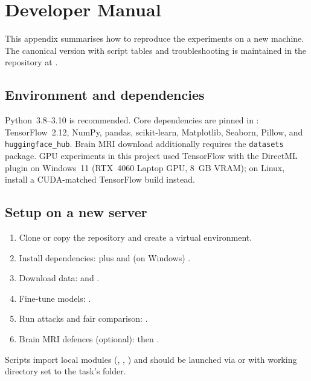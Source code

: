 \documentclass[12pt,a4paper,oneside]{report}
\begin{document}
\chapter{Developer Manual}
\label{app:dev-manual}

This appendix summarises how to reproduce the experiments on a new machine. The canonical version with script tables and troubleshooting is maintained in the repository at .

\section{Environment and dependencies}

Python~3.8--3.10 is recommended. Core dependencies are pinned in :
TensorFlow~2.12, NumPy, pandas, scikit-learn, Matplotlib, Seaborn, Pillow, and \texttt{huggingface\_hub}. Brain MRI download additionally requires the \texttt{datasets} package. GPU experiments in this project used TensorFlow with the DirectML plugin on Windows~11 (RTX~4060 Laptop GPU, 8~GB VRAM); on Linux, install a CUDA-matched TensorFlow build instead.

\section{Setup on a new server}

\begin{enumerate}
  \item Clone or copy the repository and create a virtual environment.
  \item Install dependencies:  plus  and (on Windows) .
  \item Download data:  and .
  \item Fine-tune models: .
  \item Run attacks and fair comparison: .
  \item Brain MRI defences (optional):  then .
\end{enumerate}

Scripts import local modules (, , ) and should be launched via  or with working directory set to the task's  folder.
\end{document}
